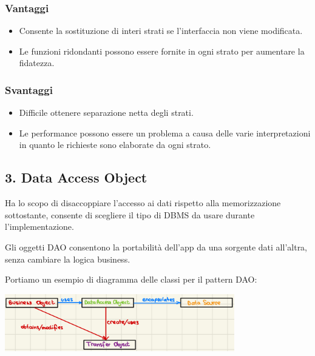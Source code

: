 \documentclass{report}
\begin{document}
\begin{multicols}{2}

    \subsubsection*{Vantaggi}
    \begin{itemize}
        \item Consente la sostituzione di interi strati se l'interfaccia non viene modificata.
        \item Le funzioni ridondanti possono essere fornite in ogni strato per aumentare la fidatezza.
    \end{itemize}
    
    \columnbreak
    
    \subsubsection*{Svantaggi}
    \begin{itemize}
        \item Difficile ottenere separazione netta degli strati.
        \item Le performance possono essere un problema a causa delle varie interpretazioni in quanto le richieste sono elaborate da ogni strato.
    \end{itemize}
    
\end{multicols}

\subsection*{3. Data Access Object}
Ha lo scopo di disaccoppiare l'accesso ai dati rispetto alla memorizzazione sottostante, consente di scegliere il tipo di DBMS da usare durante l'implementazione.

\noindent
Gli oggetti DAO consentono la portabilità dell'app da una sorgente dati all'altra, senza cambiare la logica business.

\medskip
\noindent
Portiamo un esempio di diagramma delle classi per il pattern DAO:
\begin{center}
    \includegraphics[width=0.75\textwidth]{immagini/IngSoft4.jpeg}    
\end{center}
\end{document}
